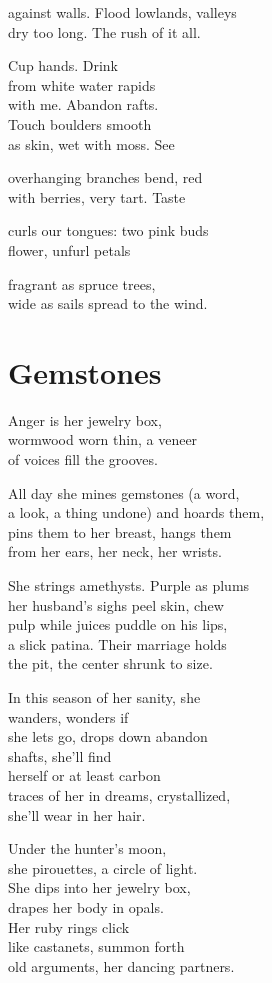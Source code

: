 \documentclass[twoside,10pt]{book}
\begin{document}
against walls. Flood lowlands, valleys\\
dry too long. The rush of it all.

Cup hands. Drink\\
from white water rapids\\
with me. Abandon rafts.\\
Touch boulders smooth\\
as skin, wet with moss. See

overhanging branches bend, red\\
with berries, very tart. Taste

curls our tongues: two pink buds\\
flower, unfurl petals

fragrant as spruce trees,\\
wide as sails spread to the wind.


\clearpage
\section{Gemstones}

Anger is her jewelry box,\\
wormwood worn thin, a veneer\\
of voices fill the grooves.

All day she mines gemstones (a word,\\
a look, a thing undone) and hoards them,\\
pins them to her breast, hangs them\\
from her ears, her neck, her wrists.

She strings amethysts. Purple as plums\\
her husband's sighs peel skin, chew\\
pulp while juices puddle on his lips,\\
a slick patina. Their marriage holds\\
the pit, the center shrunk to size.

In this season of her sanity, she\\
wanders, wonders if\\
she lets go, drops down abandon\\
shafts, she'll find\\
herself or at least carbon\\
traces of her in dreams, crystallized,\\
she'll wear in her hair.

Under the hunter's moon,\\
she pirouettes, a circle of light.\\
She dips into her jewelry box,\\
drapes her body in opals.\\
Her ruby rings click\\
like castanets, summon forth\\
old arguments, her dancing partners.
\end{document}
